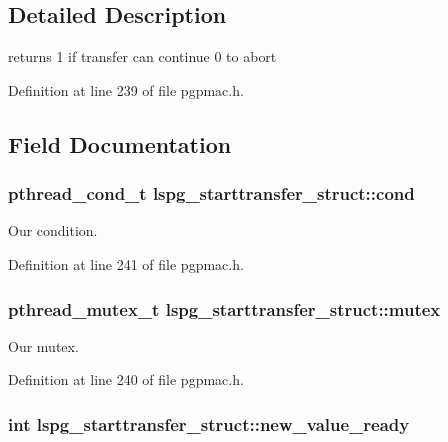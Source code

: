 \subsection{Detailed Description}
returns 1 if transfer can continue 0 to abort 

Definition at line 239 of file pgpmac.\-h.



\subsection{Field Documentation}
\hypertarget{structlspg__starttransfer__struct_a1a569a2afabd7910219ff9d2d48c1b38}{
\subsubsection[{cond}]{\setlength{\rightskip}{0pt plus 5cm}pthread\-\_\-cond\-\_\-t lspg\-\_\-starttransfer\-\_\-struct\-::cond}}\label{structlspg__starttransfer__struct_a1a569a2afabd7910219ff9d2d48c1b38}


Our condition. 



Definition at line 241 of file pgpmac.\-h.

\hypertarget{structlspg__starttransfer__struct_a47824bb2701a699d43a7a916e2010705}{
\subsubsection[{mutex}]{\setlength{\rightskip}{0pt plus 5cm}pthread\-\_\-mutex\-\_\-t lspg\-\_\-starttransfer\-\_\-struct\-::mutex}}\label{structlspg__starttransfer__struct_a47824bb2701a699d43a7a916e2010705}


Our mutex. 



Definition at line 240 of file pgpmac.\-h.

\hypertarget{structlspg__starttransfer__struct_ad3a6356e5ccce15c982ddecf9634999f}{
\subsubsection[{new\-\_\-value\-\_\-ready}]{\setlength{\rightskip}{0pt plus 5cm}int lspg\-\_\-starttransfer\-\_\-struct\-::new\-\_\-value\-\_\-ready}}\label{structlspg__starttransfer__struct_ad3a6356e5ccce15c982ddecf9634999f}


